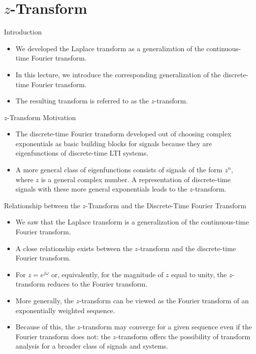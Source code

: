 \section{$z$-Transform}
\begin{frame}{Introduction}
    \begin{itemize}
        \item We developed the Laplace transform as a generalization of the continuous-time Fourier transform.
        \item In this lecture, we introduce the corresponding generalization of the discrete-time Fourier transform.
        \item The resulting transform is referred to as the $z$-transform.
    \end{itemize}
\end{frame}


\begin{frame}{$z$-Transform Motivation}
    \begin{itemize}
        \item The discrete-time Fourier transform developed out of choosing complex exponentials as basic building blocks for signals because they are eigenfunctions of discrete-time LTI systems.
        \item A more general class of eigenfunctions consists of signals of the form $z^n$, where $z$ is a general complex number. A representation of discrete-time signals with these more general exponentials leads to the $z$-transform.
    \end{itemize}
\end{frame}

\begin{frame}{Relationship between the $z$-Transform and the Discrete-Time Fourier Transform}
    \begin{itemize}
        \item We saw that the Laplace transform is a generalization of the continuous-time Fourier transform.
        \item A close relationship exists between the $z$-transform and the discrete-time Fourier transform.
        \item For $z = e^{j\omega}$ or, equivalently, for the magnitude of $z$ equal to unity, the $z$-transform reduces to the Fourier transform.
        \item More generally, the $z$-transform can be viewed as the Fourier transform of an exponentially weighted sequence.
        \item Because of this, the $z$-transform may converge for a given sequence even if the Fourier transform does not: the $z$-transform offers the possibility of transform analysis for a broader class of signals and systems.
    \end{itemize}
\end{frame}

